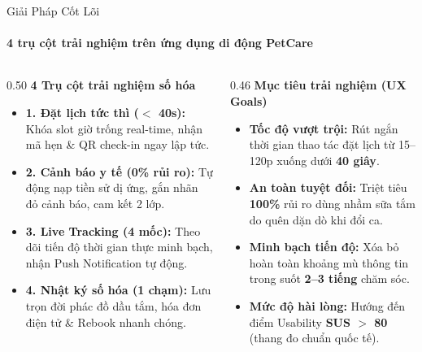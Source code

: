 \begin{frame}{Giải Pháp Cốt Lõi}
  \framesubtitle{\color{white!90}\textbf{4 trụ cột trải nghiệm trên ứng dụng di động PetCare}}

  \begin{columns}[T]
    \begin{column}{0.50\textwidth}
      {\color{PetcarePrimary}\large \textbf{4 Trụ cột trải nghiệm số hóa}}\\[2mm]
      \small
      \begin{itemize}
        \setlength\itemsep{2.8mm}
        \item \textbf{1. Đặt lịch tức thì ($<$ 40s):} Khóa slot giờ trống real-time, nhận mã hẹn \& QR check-in ngay lập tức.
        \item \textbf{2. Cảnh báo y tế (0\% rủi ro):} Tự động nạp tiền sử dị ứng, gắn nhãn đỏ cảnh báo, cam kết 2 lớp.
        \item \textbf{3. Live Tracking (4 mốc):} Theo dõi tiến độ thời gian thực minh bạch, nhận Push Notification tự động.
        \item \textbf{4. Nhật ký số hóa (1 chạm):} Lưu trọn đời phác đồ dầu tắm, hóa đơn điện tử \& Rebook nhanh chóng.
      \end{itemize}
    \end{column}

    \begin{column}{0.46\textwidth}
      {\color{PetcarePrimary}\large \textbf{Mục tiêu trải nghiệm (UX Goals)}}\\[2mm]
      \small
      \begin{itemize}
        \setlength\itemsep{2.8mm}
        \item \textbf{Tốc độ vượt trội:} Rút ngắn thời gian thao tác đặt lịch từ 15--120p xuống dưới \textbf{40 giây}.
        \item \textbf{An toàn tuyệt đối:} Triệt tiêu \textbf{100\%} rủi ro dùng nhầm sữa tắm do quên dặn dò khi đổi ca.
        \item \textbf{Minh bạch tiến độ:} Xóa bỏ hoàn toàn khoảng mù thông tin trong suốt \textbf{2--3 tiếng} chăm sóc.
        \item \textbf{Mức độ hài lòng:} Hướng đến điểm Usability \textbf{SUS $>$ 80} (thang đo chuẩn quốc tế).
      \end{itemize}
    \end{column}
  \end{columns}
\end{frame}
